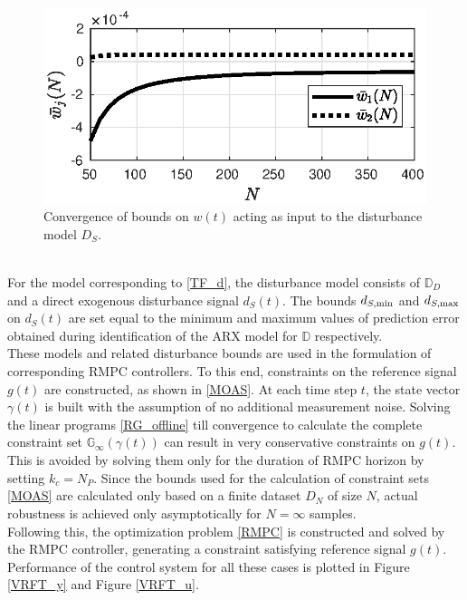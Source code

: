 \documentclass[letterpaper, 10 pt, conference]{ieeeconf}  %
\begin{document}
	\begin{figure}[h]
		\hspace{40pt}
		\includegraphics[scale = 0.50]{bounds_RG.eps}
		\caption{Convergence of bounds on $w(t)$ acting as input to the disturbance model $D_S$.}
		\label{bounds_RG}
	\end{figure} \\
	For the model corresponding to \eqref{TF_d}, the disturbance model consists of $\mathbb{D}_D$ and a direct exogenous disturbance signal $d_S(t)$. The bounds $d_{S,{\rm min}}$ and $d_{S,{\rm max}}$ on $d_S(t)$ are set equal to the minimum and maximum values of prediction error obtained during identification of the ARX model for $\mathbb{D}$ respectively. \\
	These models and related disturbance bounds are used in the formulation of corresponding RMPC controllers. To this end, constraints on the reference signal $g(t)$ are constructed, as shown in \eqref{MOAS}. At each time step $t$, the state vector $\gamma(t)$ is built with the assumption of no additional measurement noise. Solving the linear programs \eqref{RG_offline} till convergence to calculate the complete constraint set $\mathbb{G}_{\infty}(\gamma(t))$ can result in very conservative constraints on $g(t)$. This is avoided by solving them only for the duration of RMPC horizon by setting $k_c = N_P$. Since the bounds used for the calculation of constraint sets \eqref{MOAS} are calculated only based on a finite dataset $\hat{D}_{N}$ of size $N$, actual robustness is achieved only asymptotically for $N=\infty$ samples.\\
	Following this,
	the optimization problem \eqref{RMPC} is constructed and solved by the RMPC controller, generating a constraint satisfying reference signal $g(t)$.
	Performance of the control system for all these cases is plotted in Figure \ref{VRFT_y} and Figure \ref{VRFT_u}.
\end{document}
